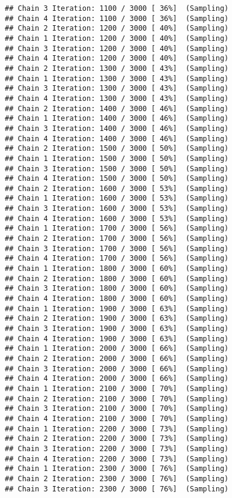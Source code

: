 \documentclass[
]{article}
\begin{document}
\begin{verbatim}
## Chain 3 Iteration: 1100 / 3000 [ 36%]  (Sampling) 
## Chain 4 Iteration: 1100 / 3000 [ 36%]  (Sampling) 
## Chain 2 Iteration: 1200 / 3000 [ 40%]  (Sampling) 
## Chain 1 Iteration: 1200 / 3000 [ 40%]  (Sampling) 
## Chain 3 Iteration: 1200 / 3000 [ 40%]  (Sampling) 
## Chain 4 Iteration: 1200 / 3000 [ 40%]  (Sampling) 
## Chain 2 Iteration: 1300 / 3000 [ 43%]  (Sampling) 
## Chain 1 Iteration: 1300 / 3000 [ 43%]  (Sampling) 
## Chain 3 Iteration: 1300 / 3000 [ 43%]  (Sampling) 
## Chain 4 Iteration: 1300 / 3000 [ 43%]  (Sampling) 
## Chain 2 Iteration: 1400 / 3000 [ 46%]  (Sampling) 
## Chain 1 Iteration: 1400 / 3000 [ 46%]  (Sampling) 
## Chain 3 Iteration: 1400 / 3000 [ 46%]  (Sampling) 
## Chain 4 Iteration: 1400 / 3000 [ 46%]  (Sampling) 
## Chain 2 Iteration: 1500 / 3000 [ 50%]  (Sampling) 
## Chain 1 Iteration: 1500 / 3000 [ 50%]  (Sampling) 
## Chain 3 Iteration: 1500 / 3000 [ 50%]  (Sampling) 
## Chain 4 Iteration: 1500 / 3000 [ 50%]  (Sampling) 
## Chain 2 Iteration: 1600 / 3000 [ 53%]  (Sampling) 
## Chain 1 Iteration: 1600 / 3000 [ 53%]  (Sampling) 
## Chain 3 Iteration: 1600 / 3000 [ 53%]  (Sampling) 
## Chain 4 Iteration: 1600 / 3000 [ 53%]  (Sampling) 
## Chain 1 Iteration: 1700 / 3000 [ 56%]  (Sampling) 
## Chain 2 Iteration: 1700 / 3000 [ 56%]  (Sampling) 
## Chain 3 Iteration: 1700 / 3000 [ 56%]  (Sampling) 
## Chain 4 Iteration: 1700 / 3000 [ 56%]  (Sampling) 
## Chain 1 Iteration: 1800 / 3000 [ 60%]  (Sampling) 
## Chain 2 Iteration: 1800 / 3000 [ 60%]  (Sampling) 
## Chain 3 Iteration: 1800 / 3000 [ 60%]  (Sampling) 
## Chain 4 Iteration: 1800 / 3000 [ 60%]  (Sampling) 
## Chain 1 Iteration: 1900 / 3000 [ 63%]  (Sampling) 
## Chain 2 Iteration: 1900 / 3000 [ 63%]  (Sampling) 
## Chain 3 Iteration: 1900 / 3000 [ 63%]  (Sampling) 
## Chain 4 Iteration: 1900 / 3000 [ 63%]  (Sampling) 
## Chain 1 Iteration: 2000 / 3000 [ 66%]  (Sampling) 
## Chain 2 Iteration: 2000 / 3000 [ 66%]  (Sampling) 
## Chain 3 Iteration: 2000 / 3000 [ 66%]  (Sampling) 
## Chain 4 Iteration: 2000 / 3000 [ 66%]  (Sampling) 
## Chain 1 Iteration: 2100 / 3000 [ 70%]  (Sampling) 
## Chain 2 Iteration: 2100 / 3000 [ 70%]  (Sampling) 
## Chain 3 Iteration: 2100 / 3000 [ 70%]  (Sampling) 
## Chain 4 Iteration: 2100 / 3000 [ 70%]  (Sampling) 
## Chain 1 Iteration: 2200 / 3000 [ 73%]  (Sampling) 
## Chain 2 Iteration: 2200 / 3000 [ 73%]  (Sampling) 
## Chain 3 Iteration: 2200 / 3000 [ 73%]  (Sampling) 
## Chain 4 Iteration: 2200 / 3000 [ 73%]  (Sampling) 
## Chain 1 Iteration: 2300 / 3000 [ 76%]  (Sampling) 
## Chain 2 Iteration: 2300 / 3000 [ 76%]  (Sampling) 
## Chain 3 Iteration: 2300 / 3000 [ 76%]  (Sampling) 

\end{verbatim}
\end{document}

